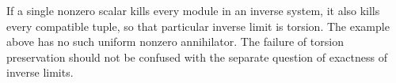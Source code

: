 \begin{remark}\label{remark-uniform-annihilator}
If a single nonzero scalar kills every module in an inverse system, it also kills every compatible tuple, so that particular inverse limit is torsion. The example above has no such uniform nonzero annihilator. The failure of torsion preservation should not be confused with the separate question of exactness of inverse limits.
\end{remark}
